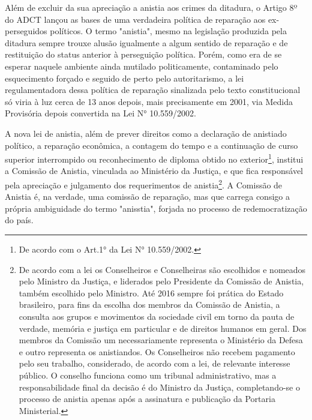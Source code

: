Além de excluir da sua apreciação a anistia aos crimes da ditadura, o
Artigo 8º do ADCT lançou as bases de uma verdadeira política de
reparação aos ex-perseguidos políticos. O termo "anistia", mesmo na
legislação produzida pela ditadura sempre trouxe alusão igualmente a
algum sentido de reparação e de restituição do status anterior à
perseguição política. Porém, como era de se esperar naquele ambiente
ainda mutilado politicamente, contaminado pelo esquecimento forçado e
seguido de perto pelo autoritarismo, a lei regulamentadora dessa
política de reparação sinalizada pelo texto constitucional só viria à
luz cerca de 13 anos depois, mais precisamente em 2001, via Medida
Provisória depois convertida na Lei N° 10.559/2002.

A nova lei de anistia, além de prever direitos como a declaração de
anistiado político, a reparação econômica, a contagem do tempo e a
continuação de curso superior interrompido ou reconhecimento de diploma
obtido no exterior\footnote{De acordo com o Art.1° da Lei N°
  10.559/2002.}, institui a Comissão de Anistia, vinculada ao Ministério
da Justiça, e que fica responsável pela apreciação e julgamento dos
requerimentos de anistia\footnote{De acordo com a lei os Conselheiros e
  Conselheiras são escolhidos e nomeados pelo Ministro da Justiça, e
  liderados pelo Presidente da Comissão de Anistia, também escolhido
  pelo Ministro. Até 2016 sempre foi prática do Estado brasileiro, para
  fins da escolha dos membros da Comissão de Anistia, a consulta aos
  grupos e movimentos da sociedade civil em torno da pauta de verdade,
  memória e justiça em particular e de direitos humanos em geral. Dos
  membros da Comissão um necessariamente representa o Ministério da
  Defesa e outro representa os anistiandos. Os Conselheiros não recebem
  pagamento pelo seu trabalho, considerado, de acordo com a lei, de
  relevante interesse público. O conselho funciona como um tribunal
  administrativo, mas a responsabilidade final da decisão é do Ministro
  da Justiça, completando-se o processo de anistia apenas após a
  assinatura e publicação da Portaria Ministerial.}. A Comissão de
Anistia é, na verdade, uma comissão de reparação, mas que carrega
consigo a própria ambiguidade do termo "anisstia", forjada no processo
de redemocratização do país.


